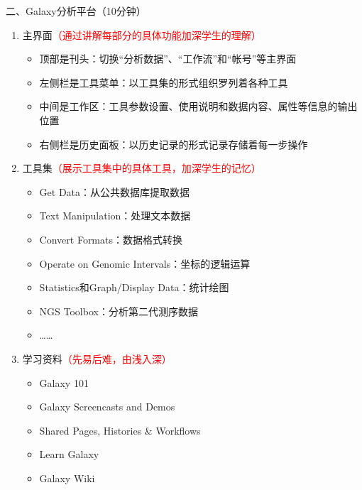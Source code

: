 \documentclass{TIJMUjiaoanLL}
\begin{document}
\vspace*{0.2cm}
\noindent
二、Galaxy分析平台（10分钟）
\begin{enumerate}
  \item 主界面\textcolor{red}{（通过讲解每部分的具体功能加深学生的理解）}
      \begin{itemize}
        \item 顶部是刊头：切换“分析数据”、“工作流”和“帐号”等主界面
        \item 左侧栏是工具菜单：以工具集的形式组织罗列着各种工具
        \item 中间是工作区：工具参数设置、使用说明和数据内容、属性等信息的输出位置
        \item 右侧栏是历史面板：以历史记录的形式记录存储着每一步操作
      \end{itemize}
    \item 工具集\textcolor{red}{（展示工具集中的具体工具，加深学生的记忆）}
      \begin{itemize}
        \item Get Data：从公共数据库提取数据
        \item Text Manipulation：处理文本数据
        \item Convert Formats：数据格式转换
        \item Operate on Genomic Intervals：坐标的逻辑运算
        \item Statistics和Graph/Display Data：统计绘图
        \item NGS Toolbox：分析第二代测序数据
        \item ……
      \end{itemize}
    \item 学习资料\textcolor{red}{（先易后难，由浅入深）}
      \begin{itemize}
        \item Galaxy 101
        \item Galaxy Screencasts and Demos
        \item Shared Pages, Histories \& Workflows
        \item Learn Galaxy
        \item Galaxy Wiki
      \end{itemize}
\end{enumerate}
\end{document}
